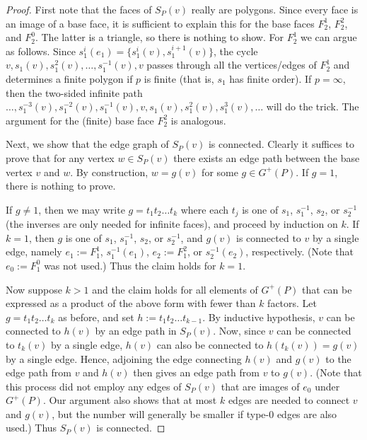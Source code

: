 \documentclass[12pt]{article}
\theoremstyle{definition}\newtheorem{definition}{Definition}[section]
\begin{document}
\begin{proof} 
First note that the faces of ${S}_P(v)$ really are polygons. Since every face is an image of a base face, it is sufficient to explain this for the base faces $F_2^1$, $F_2^2$, and $F_2^0$. The latter is a triangle, so there is nothing to show. For $F_2^1$ we can argue as follows. Since $s_1^i(e_1) = \{s_1^i(v), s_1^{i+1}(v)\}$, the cycle $v, s_1(v), s_1^2(v), \dots , s_1^{-1}(v), v$ passes through all the vertices/edges of $F_2^{1}$ and determines a finite polygon if $p$ is finite (that is, $s_1$ has finite order). If $p=\infty$, then the two-sided infinite path $\dots,s_1^{-3}(v), s_1^{-2}(v), s_1^{-1}(v),v,s_1(v),s_1^2(v),s_1^3(v),\dots$ will do the trick. The argument for the (finite) base face $F_2^{2}$ is analogous. 

Next, we show that the edge graph of ${S}_P(v)$ is connected. Clearly it suffices to prove that for any vertex $w \in {S}_P(v)$ there exists an edge path between the base vertex $v$ and $w$. By construction, $w=g(v)$ for some $g \in G^+(P)$. If $g=1$, there is nothing to prove. 

If $g\neq 1$, then we may write $g = t_{1}t_{2}\ldots t_{k}$ where each $t_j$ is one of $s_1$, $s_1^{-1}$, $s_2$, or $s_2^{-1}$ (the inverses are only needed for infinite faces), and proceed by induction on $k$. If $k=1$, then $g$ is one of $s_1$, $s_1^{-1}$, $s_2$, or $s_2^{-1}$, and $g(v)$ is connected to $v$ by a single edge, namely $e_{1}:=F_{1}^{1}$, $s_{1}^{-1}(e_{1})$, $e_{2}:=F_{1}^{2}$, or $s_{2}^{-1}(e_{2})$, respectively. (Note that $e_0:=F_{1}^{0}$ was not used.) Thus the claim holds for $k=1$. 

Now suppose $k>1$ and the claim holds for all elements of $G^+(P)$ that can be expressed as a product of the above form with fewer than $k$ factors. Let $g = t_{1}t_{2}\ldots t_{k}$ as before, and set $h :=t_{1}t_{2}\ldots t_{k-1}$. By inductive hypothesis, $v$ can be connected to $h(v)$ by an edge path in ${S}_P(v)$. Now, since $v$ can be connected to $t_{k}(v)$ by a single edge, $h(v)$ can also be connected to $h(t_{k}(v))=g(v)$ by a single edge. Hence, adjoining the edge connecting $h(v)$ and $g(v)$ to the edge path from $v$ and $h(v)$ then gives an edge path from $v$ to $g(v)$. (Note that this process did not employ any edges of ${S}_P(v)$ that are images of $e_0$ under $G^{+}(P)$. Our argument also shows that at most $k$ edges are needed to connect $v$ and $g(v)$, but the number will generally be smaller if type-0 edges are also used.) Thus ${S}_P(v)$ is connected. \smallskip


\end{proof}
\end{document}
